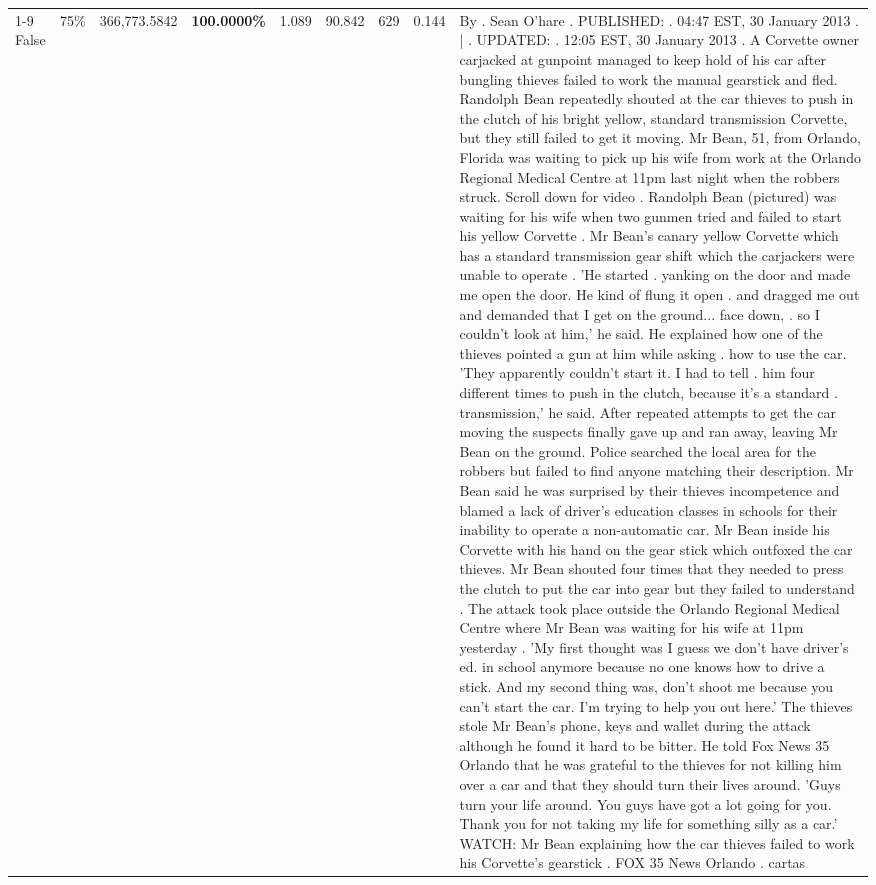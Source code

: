 \begin{table}[H]
\begin{tabular}{lllrlllll}
\cline{1-9} \cline{2-9}
False & 75\% & 366,773.5842 & \bfseries \color{red} 100.0000\% & 1.089 & 90.842 & 629 & 0.144 & By . Sean O'hare . PUBLISHED: . 04:47 EST, 30 January 2013 . | . UPDATED: . 12:05 EST, 30 January 2013 . A Corvette owner carjacked at gunpoint managed to keep hold of his car after bungling thieves failed to work the manual gearstick and fled. Randolph Bean repeatedly shouted at the car thieves to push in the clutch of his bright yellow, standard transmission Corvette, but they still failed to get it moving. Mr Bean, 51, from Orlando, Florida was waiting to pick up his wife from work at the Orlando Regional Medical Centre at 11pm last night when the robbers struck. Scroll down for video . Randolph Bean (pictured) was waiting for his wife when two gunmen tried and failed to start his yellow Corvette . Mr Bean's canary yellow Corvette which has a standard transmission gear shift which the carjackers were unable to operate . 'He started . yanking on the door and made me open the door. He kind of flung it open . and dragged me out and demanded that I get on the ground... face down, . so I couldn't look at him,' he said. He explained how one of the thieves pointed a gun at him while asking . how to use the car. 'They apparently couldn't start it. I had to tell . him four different times to push in the clutch, because it's a standard . transmission,' he said. After repeated attempts to get the car moving the suspects finally gave up and ran away, leaving Mr Bean on the ground. Police searched the local area for the robbers but failed to find anyone matching their description. Mr Bean said he was surprised by their thieves incompetence and blamed a lack of driver's education classes in schools for their inability to operate a non-automatic car. Mr Bean inside his Corvette with his hand on the gear stick which outfoxed the car thieves. Mr Bean shouted four times that they needed to press the clutch to put the car into gear but they failed to understand . The attack took place outside the Orlando Regional Medical Centre where Mr Bean was waiting for his wife at 11pm yesterday . 'My first thought was I guess we don't have driver's ed. in school anymore because no one knows how to drive a stick. And my second thing was, don't shoot me because you can't start the car. I'm trying to help you out here.' The thieves stole Mr Bean's phone, keys and wallet during the attack although he found it hard to be bitter. He told Fox News 35 Orlando that he was grateful to the thieves for not killing him over a car and that they should turn their lives around. 'Guys turn your life around. You guys have got a lot going for you. Thank you for not taking my life for something silly as a car.' WATCH: Mr Bean explaining how the car thieves failed to work his Corvette's gearstick . FOX 35 News Orlando . cartas \\

\end{tabular}
\end{table}
